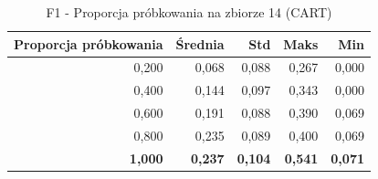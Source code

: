 \begin{table}[htbp]
\centering
\small
\setlength{\tabcolsep}{6pt}
\renewcommand{\arraystretch}{1.2}
\caption{F1 - Proporcja próbkowania na zbiorze 14 (CART)}
\label{tab:CART_sample_ratio_14_f1}
\begin{tabular}{r|r|r|r|r}
\toprule
Proporcja próbkowania & Średnia & Std & Maks & Min \\
\hline
0,200 & 0,068 & 0,088 & 0,267 & 0,000 \\
0,400 & 0,144 & 0,097 & 0,343 & 0,000 \\
0,600 & 0,191 & 0,088 & 0,390 & 0,069 \\
0,800 & 0,235 & 0,089 & 0,400 & 0,069 \\
\textbf{1,000} & \textbf{0,237} & \textbf{0,104} & \textbf{0,541} & \textbf{0,071} \\
\bottomrule
\end{tabular}
\end{table}